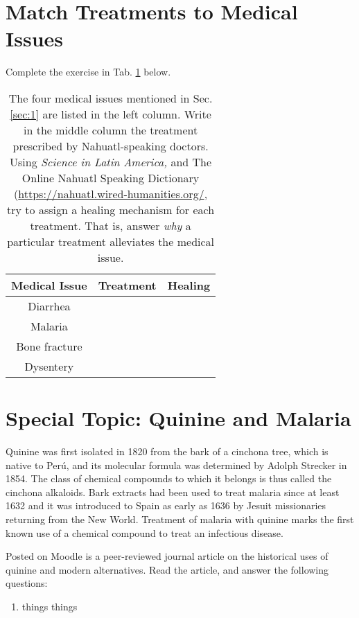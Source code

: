 \documentclass[12pt]{article}
\begin{document}
\section{Match Treatments to Medical Issues}

Complete the exercise in Tab. \ref{tab:1} below.

\begin{table}[hb]
\centering
\begin{tabular}{| c | c | c |}
\hline
\textbf{Medical Issue} & \textbf{Treatment} & \textbf{Healing} \\ \hline
Diarrhea & \hspace{7cm} & \hspace{7cm} \\ \hline
Malaria & \hspace{7cm} & \hspace{7cm} \\ \hline
Bone fracture & \hspace{7cm} & \hspace{7cm} \\ \hline
Dysentery & \hspace{7cm} & \hspace{7cm} \\ \hline
\hline
\end{tabular}
\caption{\label{tab:1} The four medical issues mentioned in Sec. \ref{sec:1} are listed in the left column.  Write in the middle column the treatment prescribed by Nahuatl-speaking doctors.  Using \textit{Science in Latin America,} and The Online Nahuatl Speaking Dictionary (\url{https://nahuatl.wired-humanities.org/}, try to assign a healing mechanism for each treatment.  That is, answer \textit{why} a particular treatment alleviates the medical issue.}
\end{table}

\section{Special Topic: Quinine and Malaria}

Quinine was first isolated in 1820 from the bark of a cinchona tree, which is native to Per\'{u}, and its molecular formula was determined by Adolph Strecker in 1854. The class of chemical compounds to which it belongs is thus called the cinchona alkaloids. Bark extracts had been used to treat malaria since at least 1632 and it was introduced to Spain as early as 1636 by Jesuit missionaries returning from the New World. Treatment of malaria with quinine marks the first known use of a chemical compound to treat an infectious disease.

Posted on Moodle is a peer-reviewed journal article on the historical uses of quinine and modern alternatives.  Read the article, and answer the following questions:

\begin{enumerate}
\item things things
\end{enumerate}
\end{document}
